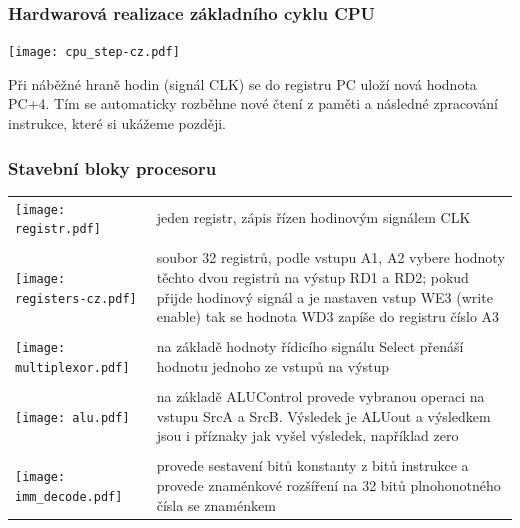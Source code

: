 \documentclass{beamer}
\begin{document}
\begin{frame}
\frametitle{Hardwarová realizace základního cyklu CPU}

\begin{center}
\texttt{[image: cpu\_step-cz.pdf]}
\end{center}

Při náběžné hraně hodin (signál CLK) se do registru PC uloží nová hodnota PC+4. Tím se automaticky rozběhne nové čtení z paměti a následné zpracování instrukce, které si ukážeme později.
\end{frame}

\begin{frame}
\frametitle{Stavební bloky procesoru}

\begin{table}
\footnotesize
\begin{tabular}{m{1.6cm} m{9.5cm}}
\hfill \texttt{[image: registr.pdf]} & jeden registr, zápis řízen hodinovým signálem CLK \\ 
\phantom{X} & \phantom{X} \\
\hfill \texttt{[image: registers-cz.pdf]} & soubor 32 registrů, podle vstupu A1, A2 vybere hodnoty těchto dvou registrů na výstup RD1 a RD2; pokud přijde hodinový signál a je nastaven vstup WE3 (write enable) tak se hodnota WD3 zapíše do registru číslo A3 \\
\phantom{X} & \phantom{X} \\
\hfill \texttt{[image: multiplexor.pdf]} & na základě hodnoty řídicího signálu Select přenáší hodnotu jednoho ze vstupů na výstup \\ 
\phantom{X} & \phantom{X} \\
\hfill \texttt{[image: alu.pdf]} & na základě ALUControl provede vybranou operaci na vstupu SrcA a SrcB. Výsledek je ALUout a výsledkem jsou i příznaky jak vyšel výsledek, například zero \\ 
\phantom{X} & \phantom{X} \\
\hfill \texttt{[image: imm\_decode.pdf]} & provede sestavení bitů konstanty z bitů instrukce a provede znaménkové rozšíření na 32 bitů plnohonotného čísla se znaménkem \\ 
\end{tabular}
\end{table}

\end{frame}
\end{document}
